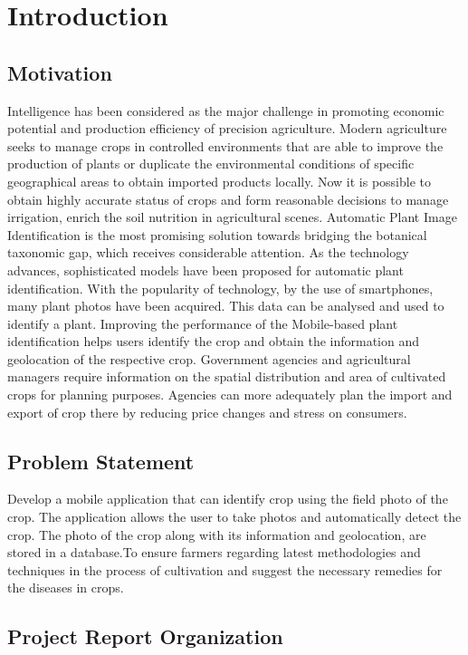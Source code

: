 \documentclass[../Report.tex]{subfiles}
\begin{document}
\chapter{Introduction}

\section{Motivation}

Intelligence has been considered as the major challenge in promoting economic potential and production efficiency of precision
agriculture. Modern agriculture seeks to manage crops in controlled environments that are able to improve the production of plants or
duplicate the environmental conditions of specific geographical areas to obtain imported products locally.
Now it is possible to obtain highly accurate status of crops and form reasonable decisions to manage irrigation, enrich the soil
nutrition in agricultural scenes. Automatic Plant Image Identification is the most promising solution towards bridging the botanical
taxonomic gap, which receives considerable attention. As the technology advances, sophisticated models have been proposed for automatic
plant identification. With the popularity of technology, by the use of smartphones, many plant photos have been acquired. This data can be
analysed and used to identify a plant. Improving the performance of the Mobile-based plant identification helps users identify the crop
and obtain the information and geolocation of the respective crop. Government agencies and agricultural managers require information on
the spatial distribution and area of cultivated crops for planning purposes. Agencies can more adequately plan the import and export of
crop there by reducing price changes and stress on consumers.

\section{Problem Statement}
Develop a mobile application that can identify crop using the field photo of the crop. The application allows the user to take photos and automatically detect the
crop. The photo of the crop along with its information and geolocation, are stored in a database.To ensure farmers regarding latest
methodologies and techniques in the process of cultivation and suggest the necessary remedies for the diseases in crops.\par


\section{Project Report Organization}
\end{document}
